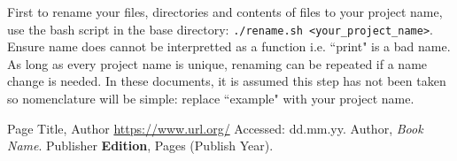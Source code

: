 \documentclass[a4paper,12pt, notitlepage]{article}
\begin{document}
First to rename your files, directories and contents of files to your project name, use the bash script in the base directory: \lstinline!./rename.sh <your_project_name>!. Ensure name does cannot be interpretted as a function i.e. ``print" is a bad name. As long as every project name is unique, renaming can be repeated if a name change is needed. In these documents, it is assumed this step has not been taken so nomenclature will be simple: replace ``example" with your project name.

\small{
\begin{thebibliography}{99}

\setlength{\itemsep}{-2mm}

 Page Title,
                  Author {\url{https://www.url.org/}} {Accessed: dd.mm.yy}.
 Author, 
                  {\em Book Name}. Publisher {\bf Edition}, Pages (Publish Year).

\end{thebibliography}
}
\end{document}
